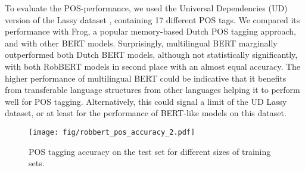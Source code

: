\documentclass[11pt,a4paper]{article}
\begin{document}
\begin{table}[tbh]
\centering
\caption{POS tagging on Lassy UD. For accuracy, we also report the 95\% confidence intervals.}
\label{tab:results-tokens}

\end{table}

To evaluate the POS-performance, we used the Universal Dependencies (UD) version of the Lassy dataset \citep{vanNoord2013lassy}, containing 17 different POS tags.
We compared its performance with Frog, a popular memory-based Dutch POS tagging approach, and with other BERT models.
Surprisingly, multilingual BERT marginally outperformed both Dutch BERT models, although not statistically significantly, with both RobBERT models in second place with an almost equal accuracy.
The higher performance of multilingual BERT could be indicative that it benefits from transferable language structures from other languages helping it to perform well for POS tagging.
Alternatively, this could signal a limit of the UD Lassy dataset, or at least for the performance of BERT-like models on this dataset.


\begin{figure}
    \centering
    \texttt{[image: fig/robbert\_pos\_accuracy\_2.pdf]}
    \caption{POS tagging accuracy on the test set for different sizes of training sets.}
    \label{fig:robbert-pos-acc}
\end{figure}
\end{document}
